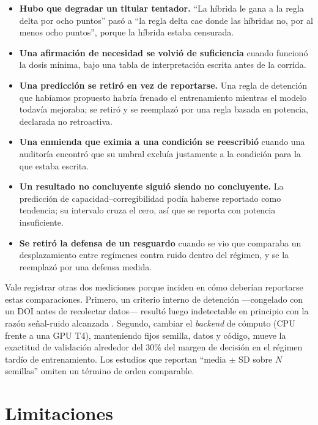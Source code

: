 \documentclass[jou,11pt,donotrepeattitle]{apa7}
\begin{document}
\begin{itemize}
  \item \textbf{Hubo que degradar un titular tentador.} \enquote{La h\'ibrida le gana a la regla
        delta por ocho puntos} pas\'o a \enquote{la regla delta cae donde las h\'ibridas no, por
        al menos ocho puntos}, porque la h\'ibrida estaba censurada.
  \item \textbf{Una afirmaci\'on de necesidad se volvi\'o de suficiencia} cuando funcion\'o la
        dosis m\'inima, bajo una tabla de interpretaci\'on escrita antes de la corrida.
  \item \textbf{Una predicci\'on se retir\'o en vez de reportarse.} Una regla de detenci\'on que
        hab\'iamos propuesto habr\'ia frenado el entrenamiento mientras el modelo todav\'ia
        mejoraba; se retir\'o y se reemplaz\'o por una regla basada en potencia, declarada no
        retroactiva.
  \item \textbf{Una enmienda que eximia a una condici\'on se reescribi\'o} cuando una
        auditor\'ia encontr\'o que su umbral exclu\'ia justamente a la condici\'on para la que
        estaba escrita.
  \item \textbf{Un resultado no concluyente sigui\'o siendo no concluyente.} La predicci\'on de
        capacidad--corregibilidad pod\'ia haberse reportado como tendencia; su intervalo cruza el
        cero, as\'i que se reporta con potencia insuficiente.
  \item \textbf{Se retir\'o la defensa de un resguardo} cuando se vio que comparaba un
        desplazamiento entre reg\'imenes contra ruido dentro del r\'egimen, y se la reemplaz\'o
        por una defensa medida.
\end{itemize}

Vale registrar otras dos mediciones porque inciden en c\'omo deber\'ian reportarse estas
comparaciones. Primero, un criterio interno de detenci\'on ---congelado con un DOI antes de
recolectar datos--- result\'o luego indetectable en principio con la raz\'on se\~nal-ruido
alcanzada \parencite{speranza2026stopping}. Segundo, cambiar el \emph{backend} de
c\'omputo (CPU frente a una GPU T4), manteniendo fijos semilla, datos y c\'odigo, mueve la
exactitud de validaci\'on alrededor del $30\%$ del margen de decisi\'on en el r\'egimen tard\'io
de entrenamiento. Los estudios que reportan \enquote{media $\pm$ SD sobre $N$ semillas} omiten un
t\'ermino de orden comparable.

\section{Limitaciones}
\end{document}
